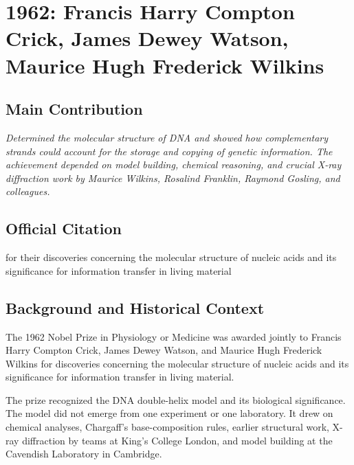 \chapter[1962 --- Crick, Watson, and Wilkins]{1962: Francis Harry Compton Crick, James Dewey Watson, Maurice Hugh Frederick Wilkins}
\label{ch:1962_Crick}

\section*{Main Contribution}

\textit{Determined the molecular structure of DNA and showed how complementary strands could account for the storage and copying of genetic information. The achievement depended on model building, chemical reasoning, and crucial X-ray diffraction work by Maurice Wilkins, Rosalind Franklin, Raymond Gosling, and colleagues.}\cite{nobel-1962,lecture-crick-1962,lecture-wilkins-1962}

\section{Official Citation}

for their discoveries concerning the molecular structure of nucleic acids and its significance for information transfer in living material

\section{Background and Historical Context}

The 1962 Nobel Prize in Physiology or Medicine was awarded jointly to Francis Harry Compton Crick, James Dewey Watson, and Maurice Hugh Frederick Wilkins for discoveries concerning the molecular structure of nucleic acids and its significance for information transfer in living material.\cite{nobel-1962}

The prize recognized the DNA double-helix model and its biological significance. The model did not emerge from one experiment or one laboratory. It drew on chemical analyses, Chargaff's base-composition rules, earlier structural work, X-ray diffraction by teams at King's College London, and model building at the Cavendish Laboratory in Cambridge.

